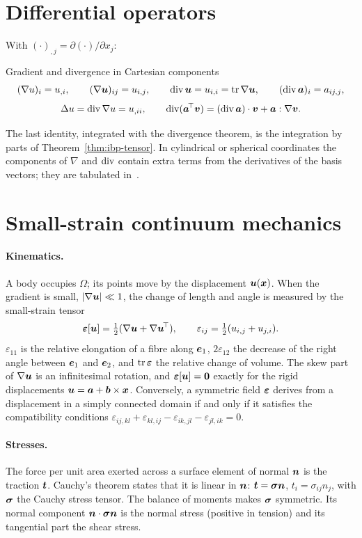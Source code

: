 \section{Differential operators}\label{sec:pre-calculus}
%
With $(\cdot)_{,j}=\partial(\cdot)/\partial x_j$:
\begin{gbox}{Gradient and divergence in Cartesian components}
\[
  (\nabla u)_i=u_{,i},\qquad (\nabla\bm{u})_{ij}=u_{i,j},\qquad
  \operatorname{div}\bm{u}=u_{i,i}=\operatorname{tr}\nabla\bm{u},\qquad (\operatorname{div}\bm{a})_i=a_{ij,j},
\]
\[
  \Delta u=\operatorname{div}\nabla u=u_{,ii},\qquad
  \operatorname{div}(\bm{a}^{\!\top}\bm{v})=(\operatorname{div}\bm{a})\cdot\bm{v}+\bm{a}:\nabla\bm{v} .
\]
\end{gbox}
The last identity, integrated with the divergence theorem, is the integration
by parts of Theorem~\ref{thm:ibp-tensor}. In cylindrical or spherical
coordinates the components of $\nabla$ and $\operatorname{div}$ contain extra terms from the
derivatives of the basis vectors; they are tabulated in~\cite{SalenconPre}.

\section{Small-strain continuum mechanics}\label{sec:pre-continuum}
\paragraph{Kinematics.}
%
A body occupies $\Omega$; its points move by the displacement $\bm{u}(\bm{x})$. When
the gradient is small, $|\nabla\bm{u}|\ll1$, the change of length and angle is
measured by the small-strain tensor
\[
  \bm{\varepsilon}[\bm{u}]=\tfrac12(\nabla\bm{u}+\nabla\bm{u}^{\!\top}),\qquad
  \varepsilon_{ij}=\tfrac12(u_{i,j}+u_{j,i}).
\]
$\varepsilon_{11}$ is the relative elongation of a fibre along $\bm{e}_1$,
$2\varepsilon_{12}$ the decrease of the right angle between $\bm{e}_1$ and $\bm{e}_2$,
and $\operatorname{tr}\bm{\varepsilon}$ the relative change of volume. The skew part of $\nabla\bm{u}$ is an
infinitesimal rotation, and $\bm{\varepsilon}[\bm{u}]=\bm{0}$ exactly for the rigid
displacements $\bm{u}=\bm{a}+\bm{b}\times\bm{x}$. Conversely, a symmetric field $\bm{\varepsilon}$
derives from a displacement in a simply connected domain if and only if it
satisfies the compatibility conditions
$\varepsilon_{ij,kl}+\varepsilon_{kl,ij}-\varepsilon_{ik,jl}-\varepsilon_{jl,ik}=0$.

\paragraph{Stresses.}
%
The force per unit area exerted across a surface element of normal $\bm{n}$ is
the traction $\bm{t}$. Cauchy's theorem states that it is linear in $\bm{n}$:
$\bm{t}=\bm{\sigma}\bm{n}$, $t_i=\sigma_{ij}n_j$, with $\bm{\sigma}$ the Cauchy stress tensor. The
balance of moments makes $\bm{\sigma}$ symmetric. Its normal component
$\bm{n}\cdot\bm{\sigma}\bm{n}$ is the normal stress (positive in tension) and its
tangential part the shear stress.

